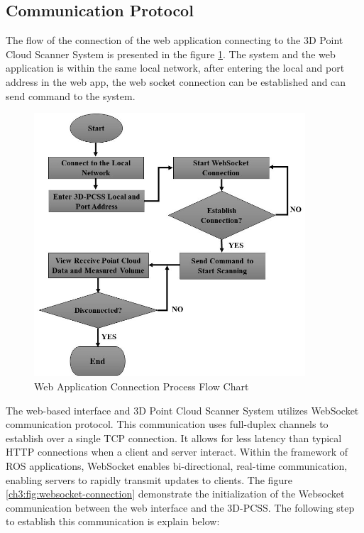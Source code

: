 \subsection{Communication Protocol}
The flow of the connection of the web application connecting to the 3D Point Cloud Scanner System is presented in the figure \ref{ch3:fig:web_app_connection}. The system and the web application is within the same local network, after entering the local and port address in the web app, the web socket connection can be established and can send command to the system.

\begin{figure}[H]
	\centering
	\includegraphics[width=0.9\textwidth]{Figures/web_app_connection}
	\caption{Web Application Connection Process Flow Chart}
	\label{ch3:fig:web_app_connection}
\end{figure}

The web-based interface and 3D Point Cloud Scanner System utilizes WebSocket communication protocol. This communication uses full-duplex channels to establish over a single TCP connection. It allows for less latency than typical HTTP connections when a client and server interact. Within the framework of ROS applications, WebSocket enables bi-directional, real-time communication, enabling servers to rapidly transmit updates to clients. The figure \ref{ch3:fig:websocket-connection} demonstrate the initialization of the Websocket communication between the web interface and the 3D-PCSS. The following step to establish this communication is explain below:

